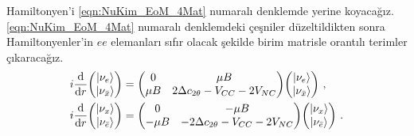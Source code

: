 Hamiltonyen'i \eqref{eqn:NuKim_EoM_4Mat} numaralı denklemde yerine koyacağız. \eqref{eqn:NuKim_EoM_4Mat} numaralı denklemdeki çeşniler düzeltildikten sonra Hamiltonyenler'in $ ee $ elemanları sıfır olacak şekilde birim matrisle orantılı terimler çıkaracağız.
\begin{align}
	\label{eqn:EoM_14Matris}i\dv{}{r} \mqty(\ket{\nu_{e}} \\ \ket{\nu_{\bar{x}}}) &= 
	\mqty(0 & \mu B \\ \mu B & 2\Delta c_{2\theta}-V_{CC}-2V_{NC}    ) 
	\mqty(\ket{\nu_{e}}\\ \ket{\nu_{\bar{x}}}) \text{ ,}\\
	\label{eqn:EoM_23Matris}i\dv{}{r} \mqty(\ket{\nu_{x}} \\ \ket{\nu_{\bar{e}}}) &= 
	\mqty(0 & -\mu B \\ -\mu B & -2\Delta c_{2\theta}-V_{CC}-2V_{NC} ) 
	\mqty(\ket{\nu_{x}}\\ \ket{\nu_{\bar{e}}}) \text{ .}
\end{align}

